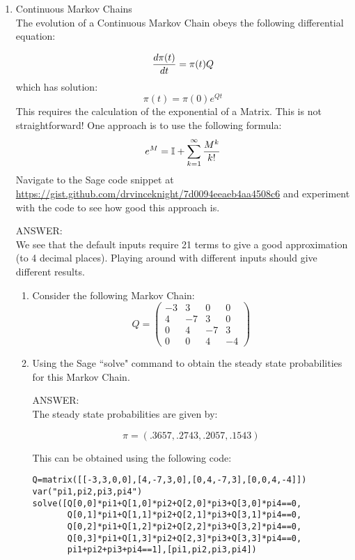 \documentclass[12pt]{article}
\begin{document}
\begin{enumerate}
\begin{enumerate}
\end{enumerate}
\item Continuous Markov Chains\\
The evolution of a Continuous Markov Chain obeys the following differential equation:

$${d\pi(t)\over dt}=\pi(t)Q$$
which has solution:
$$\pi(t)=\pi(0)e^{Qt}$$
This requires the calculation of the exponential of a Matrix. This is not straightforward! One approach is to use the following formula:
$$
e^{M}=\mathbb{I}+\sum_{k=1}^{\infty}{M^k\over k!}
$$
Navigate to the Sage code snippet at \url{https://gist.github.com/drvinceknight/7d0094eeaeb4aa4508c6} and experiment with the code to see how good this approach is.

ANSWER:\\
We see that the default inputs require 21 terms to give a good approximation (to 4 decimal places). Playing around with different inputs should give different results.

\begin{enumerate}
\item Consider the following Markov Chain:
$$Q=\begin{pmatrix}
-3&3&0&0\\
4&-7&3&0\\
0&4&-7&3\\
0&0&4&-4
\end{pmatrix}$$
\item Using the Sage ``solve" command to obtain the steady state probabilities for this Markov Chain.

ANSWER:\\
The steady state probabilities are given by:

$$\pi=(.3657,.2743,.2057,.1543)$$

This can be obtained using the following code:

\begin{verbatim}
Q=matrix([[-3,3,0,0],[4,-7,3,0],[0,4,-7,3],[0,0,4,-4]])
var("pi1,pi2,pi3,pi4")
solve([Q[0,0]*pi1+Q[1,0]*pi2+Q[2,0]*pi3+Q[3,0]*pi4==0,
       Q[0,1]*pi1+Q[1,1]*pi2+Q[2,1]*pi3+Q[3,1]*pi4==0,
       Q[0,2]*pi1+Q[1,2]*pi2+Q[2,2]*pi3+Q[3,2]*pi4==0,
       Q[0,3]*pi1+Q[1,3]*pi2+Q[2,3]*pi3+Q[3,3]*pi4==0,
       pi1+pi2+pi3+pi4==1],[pi1,pi2,pi3,pi4])
\end{verbatim}
\end{enumerate}
\end{enumerate}
\end{document}
